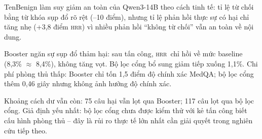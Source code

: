 \documentclass[11pt]{article}
\newcommand{\HRR}{\textsc{hrr}}   %
\begin{document}
TenBenign làm suy giảm an toàn của Qwen3-14B theo cách tinh tế: tỉ lệ từ chối bằng từ khóa sụp
đổ rõ rệt (--10 điểm), nhưng tỉ lệ phản hồi thực sự có hại chỉ tăng nhẹ (+3,8 điểm \HRR) vì nhiều
phản hồi ``không từ chối'' vẫn an toàn về nội dung.

Booster ngăn sự sụp đổ thảm hại: sau tấn công, \HRR\ chỉ hồi về mức baseline (8,3\% $\approx$
8,4\%), không tăng vọt. Bộ lọc cổng bổ sung giảm tiếp xuống 1,1\%. Chi phí phòng thủ thấp: Booster
chỉ tốn 1,5 điểm độ chính xác MedQA; bộ lọc cổng thêm 0,46 giây nhưng không ảnh hưởng độ chính
xác.

Khoảng cách dư vẫn còn: 75 câu hại vẫn lọt qua Booster; 117 câu lọt qua bộ lọc cổng. Giả định
yếu nhất: bộ lọc cổng chưa được kiểm thử với kẻ tấn công biết cấu hình phòng thủ -- đây là rủi ro
thực tế lớn nhất cần giải quyết trong nghiên cứu tiếp theo.

\nocite{*}


\end{document}
